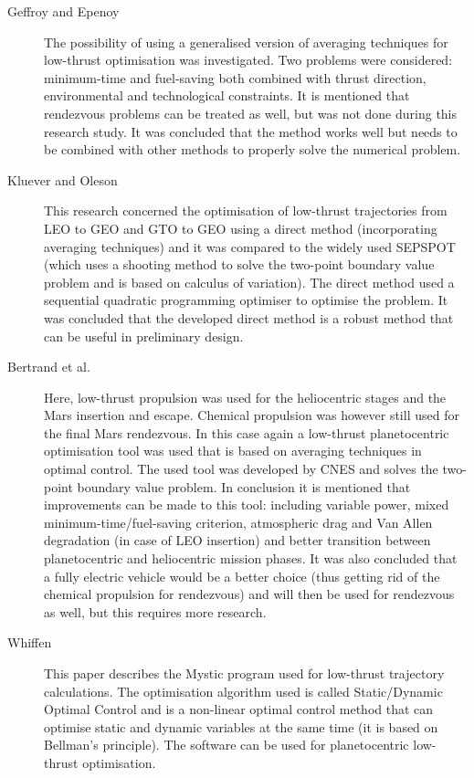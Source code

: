 \begin{description}
\item[Geffroy and Epenoy  \cite{geffroy1997optimal}] The possibility of using a generalised version of averaging techniques for low-thrust optimisation was investigated. Two problems were considered: minimum-time and fuel-saving both combined with thrust direction, environmental and technological constraints. It is mentioned that rendezvous problems can be treated as well, but was not done during this research study. It was concluded that the method works well but needs to be combined with other methods to properly solve the numerical problem.
\item[Kluever and Oleson \cite{kluever1998direct}] This research concerned the optimisation of low-thrust trajectories from \ac{LEO} to \ac{GEO} and \ac{GTO} to \ac{GEO} using a direct method (incorporating averaging techniques) and it was compared to the widely used SEPSPOT (which uses a shooting method to solve the two-point boundary value problem and is based on calculus of variation). The direct method used a sequential quadratic programming optimiser to optimise the problem. It was concluded that the developed direct method is a robust method that can be useful in preliminary design.
\item[Bertrand et al. \cite{bertrand2001electric}] Here, low-thrust propulsion was used for the heliocentric stages and the Mars insertion and escape. Chemical propulsion was however still used for the final Mars rendezvous. In this case again a low-thrust planetocentric optimisation tool was used that is based on averaging techniques in optimal control. The used tool was developed by \ac{CNES} and solves the two-point boundary value problem. In conclusion it is mentioned that improvements can be made to this tool: including variable power, mixed minimum-time/fuel-saving criterion, atmospheric drag and Van Allen degradation (in case of \ac{LEO} insertion) and better transition between planetocentric and heliocentric mission phases. It was also concluded that a fully electric vehicle would be a better choice (thus getting rid of the chemical propulsion for rendezvous) and will then be used for rendezvous as well, but this requires more research.
\item[Whiffen \cite{whiffen2006mystic}] This paper describes the Mystic program used for low-thrust trajectory calculations. The optimisation algorithm used is called Static/Dynamic Optimal Control and is a non-linear optimal control method that can optimise static and dynamic variables at the same time (it is based on Bellman's principle). The software can be used for planetocentric low-thrust optimisation.

\end{description}
